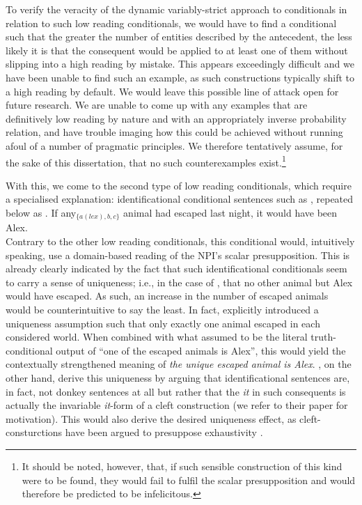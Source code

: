 To verify the veracity of the dynamic variably-strict approach to conditionals in relation to such low reading conditionals, we would have to find a conditional such that the greater the number of entities described by the antecedent, the less likely it is that the consequent would be applied to at least one of them without slipping into a high reading by mistake. This appears exceedingly difficult and we have been unable to find such an example, as such constructions typically shift to a high reading by default. We would leave this possible line of attack open for future research. We are unable to come up with any examples that are definitively low reading by nature and with an appropriately inverse probability relation, and have trouble imaging how this could be achieved without running afoul of a number of pragmatic principles. We therefore tentatively assume, for the sake of this dissertation, that no such counterexamples exist.\footnote{It should be noted, however, that, if such sensible construction of this kind were to be found, they would fail to fulfil the scalar presupposition and would therefore be predicted to be infelicitous.}

With this, we come to the second type of low reading conditionals, which require a specialised explanation: identificational conditional sentences such as , repeated below as .
\ex
If any$_{\{a(lex),b,c\}}$ animal had escaped last night, it would have been Alex.\\\emptyfill\parencite[adapted from][p.~300]{Walker2015}\label{ex:lowreading-npi2-2}
\xe
Contrary to the other low reading conditionals, this conditional would, intuitively speaking, use a domain-based reading of the NPI's scalar presupposition. This is already clearly indicated by the fact that such identificational conditionals seem to carry a sense of uniqueness; i.e., in the case of , that no other animal but Alex would have escaped. As such, an increase in the number of escaped animals would be counterintuitive to say the least. In fact, \textcite[p.~395]{vanRooij2006} explicitly introduced a uniqueness assumption such that only exactly one animal escaped in each considered world. When combined with what \textcite{vanRooij2006} assumed to be the literal truth-conditional output of \enquote{one of the escaped animals is Alex}, this would yield the contextually strengthened meaning of \textit{the unique escaped animal is Alex}. \textcite[p.~300f]{Walker2015}, on the other hand, derive this uniqueness by arguing that identificational sentences are, in fact, not donkey sentences at all but rather that the \textit{it} in such consequents is actually the invariable \textit{it}-form of a cleft construction (we refer to their paper for motivation). This would also derive the desired uniqueness effect, as cleft-consturctions have been argued to presuppose exhaustivity \parencite[e.g.][]{Buring2011}. 

